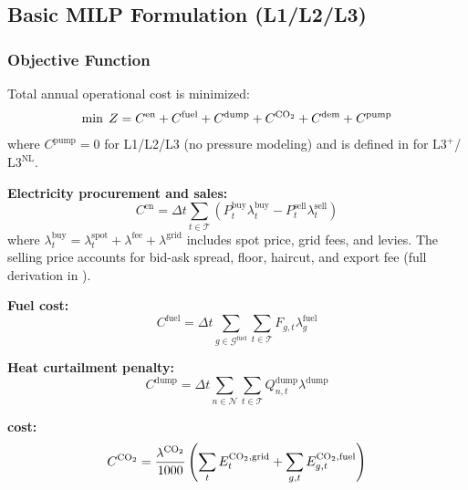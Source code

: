 \documentclass[review,3p]{elsarticle}
\newcommand{\Lplus}{\mathrm{L3}^{+}}
\newcommand{\Lnl}{\mathrm{L3}^{\mathrm{NL}}}
\begin{document}
\subsection{Basic MILP Formulation (L1/L2/L3)}
\label{sec:milp}

\subsubsection{Objective Function}

Total annual operational cost is minimized:
\begin{equation}
\min \; Z = C^{\mathrm{en}} + C^{\mathrm{fuel}}
+ C^{\mathrm{dump}} + C^{\ce{CO2}} + C^{\mathrm{dem}}
+ C^{\mathrm{pump}}
\label{eq:objective}
\end{equation}
where $C^{\mathrm{pump}} = 0$ for L1/L2/L3 (no pressure modeling)
and is defined in  for $\Lplus$/$\Lnl$.

\textbf{Electricity procurement and sales:}
\begin{equation}
C^{\mathrm{en}} = \Delta t \sum_{t \in \mathcal{T}} \left(
P_t^{\mathrm{buy}} \lambda_t^{\mathrm{buy}}
- P_t^{\mathrm{sell}} \lambda_t^{\mathrm{sell}} \right)
\label{eq:cost_energy}
\end{equation}
where $\lambda_t^{\mathrm{buy}} = \lambda_t^{\mathrm{spot}}
+ \lambda^{\mathrm{fee}} + \lambda^{\mathrm{grid}}$ includes spot
price, grid fees, and levies. The selling price accounts for bid-ask
spread, floor, haircut, and export fee (full derivation in
).

\textbf{Fuel cost:}
\begin{equation}
C^{\mathrm{fuel}} = \Delta t \sum_{g \in \mathcal{G}^{\mathrm{fuel}}}
\sum_{t \in \mathcal{T}} F_{g,t} \lambda_g^{\mathrm{fuel}}
\label{eq:cost_fuel}
\end{equation}

\textbf{Heat curtailment penalty:}
\begin{equation}
C^{\mathrm{dump}} = \Delta t \sum_{n \in \mathcal{N}}
\sum_{t \in \mathcal{T}} Q_{n,t}^{\mathrm{dump}}
\lambda^{\mathrm{dump}}
\label{eq:cost_dump}
\end{equation}

\textbf{ cost:}
\begin{equation}
C^{\ce{CO2}} = \frac{\lambda^{\ce{CO2}}}{1000} \left(
\sum_{t} E_t^{\ce{CO2},\mathrm{grid}}
+ \sum_{g,t} E_{g,t}^{\ce{CO2},\mathrm{fuel}} \right)
\label{eq:cost_co2}
\end{equation}
\end{document}
